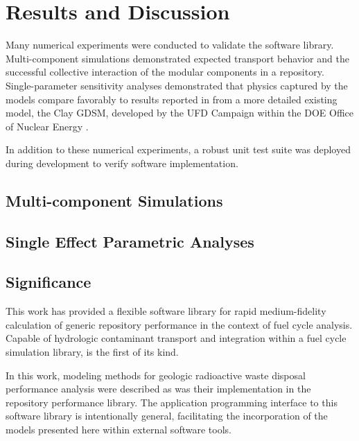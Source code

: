 \section{Results and Discussion}
\label{sec:results}

Many numerical experiments were conducted to validate the \Cyder software library.
Multi-component simulations demonstrated expected transport behavior and
the successful collective interaction of the modular
components in a \Cyder repository. Single-parameter sensitivity analyses
demonstrated that physics captured by the \Cyder models compare favorably to
results reported in \cite{huff_key_2012} from a more detailed existing model,
the Clay \gls{GDSM}, developed by the \gls{UFD} Campaign within the
\gls{DOE} Office of Nuclear Energy \cite{clayton_generic_2011}.

In addition to these numerical experiments, a robust unit test suite was
deployed during development to verify \Cyder software implementation.

\subsection{Multi-component Simulations}




\subsection{Single Effect Parametric Analyses}


\subsection{Significance}

This work has provided a flexible software library for rapid medium-fidelity
calculation of generic repository performance in the context of fuel cycle
analysis.  Capable of hydrologic contaminant transport and integration within a
fuel cycle simulation library, \Cyder is the first of its kind.

In this work, modeling methods for geologic radioactive waste disposal
performance analysis were described as was their implementation in the \Cyder
repository performance library. The application programming interface to this
software library is intentionally general, facilitating the incorporation of
the models presented here within external software tools.

